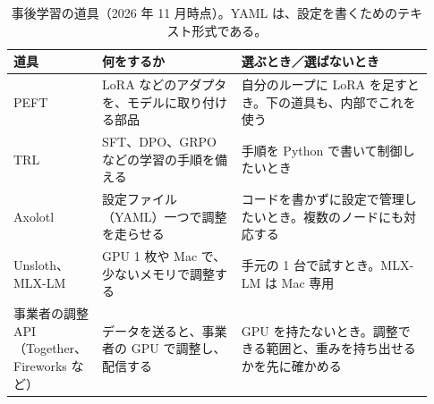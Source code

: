 \begin{table}[htbp]
\centering\footnotesize
\caption{事後学習の道具（2026 年 11 月時点）。YAML は、設定を書くためのテキスト形式である。}
\label{tab:tm-post}
\begin{tabular}{@{}>{\raggedright\arraybackslash}p{0.17\linewidth}>{\raggedright\arraybackslash}p{0.32\linewidth}>{\raggedright\arraybackslash}p{0.44\linewidth}@{}}
\toprule
道具 & 何をするか & 選ぶとき／選ばないとき \\
\midrule
PEFT & LoRA などのアダプタを、モデルに取り付ける部品 & 自分のループに LoRA を足すとき。下の道具も、内部でこれを使う \\
\addlinespace[2pt]
TRL & SFT、DPO、GRPO などの学習の手順を備える & 手順を Python で書いて制御したいとき \\
\addlinespace[2pt]
Axolotl & 設定ファイル（YAML）一つで調整を走らせる & コードを書かずに設定で管理したいとき。複数のノードにも対応する \\
\addlinespace[2pt]
Unsloth、MLX-LM & GPU 1 枚や Mac で、少ないメモリで調整する & 手元の 1 台で試すとき。MLX-LM は Mac 専用 \\
\addlinespace[2pt]
事業者の調整 API（Together、Fireworks など） & データを送ると、事業者の GPU で調整し、配信する & GPU を持たないとき。調整できる範囲と、重みを持ち出せるかを先に確かめる \\
\bottomrule
\end{tabular}
\end{table}

